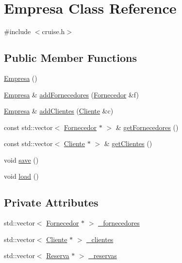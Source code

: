 \hypertarget{classEmpresa}{}\section{Empresa Class Reference}
\label{classEmpresa}


{\ttfamily \#include $<$cruise.\+h$>$}

\subsection*{Public Member Functions}
\begin{DoxyCompactItemize}
\item 
\hyperlink{classEmpresa_aff124b958356c479ab50ddf4cf302193}{Empresa} ()
\item 
\hyperlink{classEmpresa}{Empresa} \& \hyperlink{classEmpresa_a0c858479d6e92094adbb2fc085039376}{add\+Fornecedores} (\hyperlink{classFornecedor}{Fornecedor} \&f)
\item 
\hyperlink{classEmpresa}{Empresa} \& \hyperlink{classEmpresa_a57597ec4154f274686bc648ccf5d2a59}{add\+Clientes} (\hyperlink{classCliente}{Cliente} \&c)
\item 
const std\+::vector$<$ \hyperlink{classFornecedor}{Fornecedor} $\ast$ $>$ \& \hyperlink{classEmpresa_aaf131a375aa70819205744328a4dbc07}{get\+Fornecedores} ()
\item 
const std\+::vector$<$ \hyperlink{classCliente}{Cliente} $\ast$ $>$ \& \hyperlink{classEmpresa_a472beae89ee1187e1ec3f70e9d4a99ef}{get\+Clientes} ()
\item 
void \hyperlink{classEmpresa_afbde694da902870437443de43dae8071}{save} ()
\item 
void \hyperlink{classEmpresa_a3445c3c507b4f45d1d7831908ff4cdf1}{load} ()
\end{DoxyCompactItemize}
\subsection*{Private Attributes}
\begin{DoxyCompactItemize}
\item 
std\+::vector$<$ \hyperlink{classFornecedor}{Fornecedor} $\ast$ $>$ \hyperlink{classEmpresa_a535f4cd93e7aec4983e1abce799708e7}{\+\_\+fornecedores}
\item 
std\+::vector$<$ \hyperlink{classCliente}{Cliente} $\ast$ $>$ \hyperlink{classEmpresa_a82ee7236b9de27ed7192b193cb9f7b1f}{\+\_\+clientes}
\item 
std\+::vector$<$ \hyperlink{classReserva}{Reserva} $\ast$ $>$ \hyperlink{classEmpresa_a310a7271e2da4281af00cc5e80baf250}{\+\_\+reservas}
\end{DoxyCompactItemize}


